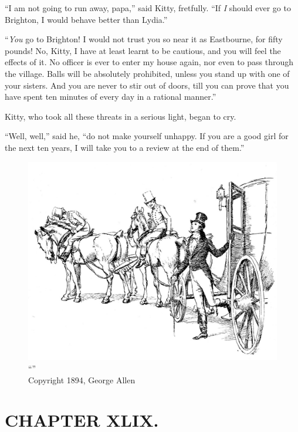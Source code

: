 ``I am not going to run away, papa,'' said Kitty, fretfully. ``If \textit{I} should ever go to Brighton, I would behave better than Lydia.''

``\textit{You} go to Brighton! I would not trust you so near it as Eastbourne, for fifty pounds! No, Kitty, I have at least learnt to be cautious, and you will feel the effects of it. No officer is ever to enter my house again, nor even to pass through the village. Balls will be absolutely prohibited, unless you stand up with one of your sisters. And you are never to stir out of doors, till you can prove that you have spent ten minutes of every day in a rational manner.''

Kitty, who took all these threats in a serious light, began to cry.

``Well, well,'' said he, ``do not make yourself unhappy. If you are a good girl for the next ten years, I will take you to a review at the end of them.''

\begin{figure}[htbp]
    \centering
    \includegraphics[width=\textwidth]{illustrations/i_031.jpg}
    \caption{“”\\ Copyright 1894, George Allen}
    \label{fig:image}
\end{figure}


\chapter{CHAPTER XLIX.}


